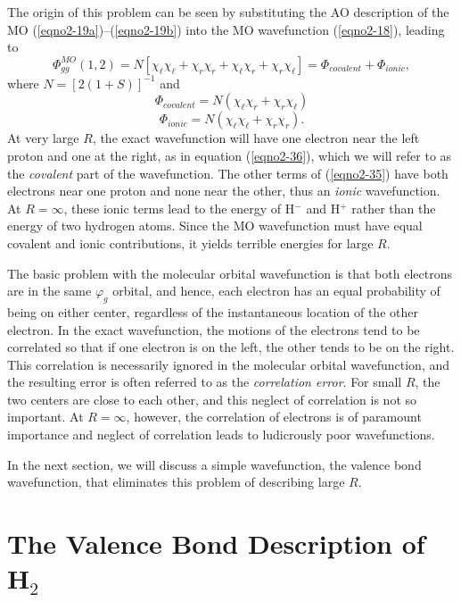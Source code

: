 The origin of this problem can be seen by substituting the AO
description of the MO (\ref{eqno2-19a})--(\ref{eqno2-19b}) into the MO
wavefunction (\ref{eqno2-18}), leading to
\begin{equation}
\Phi^{MO}_{gg} ( 1 , 2 ) = N \left[ \chi_\ell \chi_\ell + \chi_r \chi_r + 
\chi_\ell \chi_r + \chi_r \chi_\ell \right] = \Phi_{covalent} + 
\Phi_{ionic},
\label{eqno2-35}
\end{equation}
where $N = [2(1+S)]^{-1}$ and
\begin{equation}
\Phi_{covalent} = N \left( \chi_\ell \chi_r + \chi_r \chi_\ell 
\right)
\label{eqno2-36}
\end{equation}
\begin{equation}
\Phi_{ionic} = N \left( \chi_\ell \chi_\ell + \chi_r \chi_r \right).
\end{equation}
At very large $R$, the exact wavefunction will have one electron near
the left proton and one at the right, as in equation (\ref{eqno2-36}),
which we will refer to as the \emph{covalent} part of the
wavefunction. The other terms of (\ref{eqno2-35}) have both electrons
near one proton and none near the other, thus an \emph{ionic}
wavefunction. At $R = \infty$, these ionic terms lead to the energy of
H$^-$ and H$^+$ rather than the energy of two hydrogen atoms. Since
the MO wavefunction must have equal covalent and ionic
contributions, it yields terrible energies for large $R$.
    
The basic problem with the molecular orbital wavefunction is that both
electrons are in the same $\varphi_g$ orbital, and hence, each
electron has an equal probability of being on either center,
regardless of the instantaneous location of the other electron. In the
exact wavefunction, the motions of the electrons tend to be correlated
so that if one electron is on the left, the other tends to be on the
right. This correlation is necessarily ignored in the molecular
orbital wavefunction, and the resulting error is often referred to as
the \emph{correlation error}.  For small $R$, the two centers are
close to each other, and this neglect of correlation is not so
important. At $R = \infty$, however, the correlation of electrons is
of paramount importance and neglect of correlation leads to
ludicrously poor wavefunctions.
    
In the next section, we will discuss a simple wavefunction, the valence bond
wavefunction, that eliminates this problem of describing large $R$.

\section{The Valence Bond Description of H$_2$}

